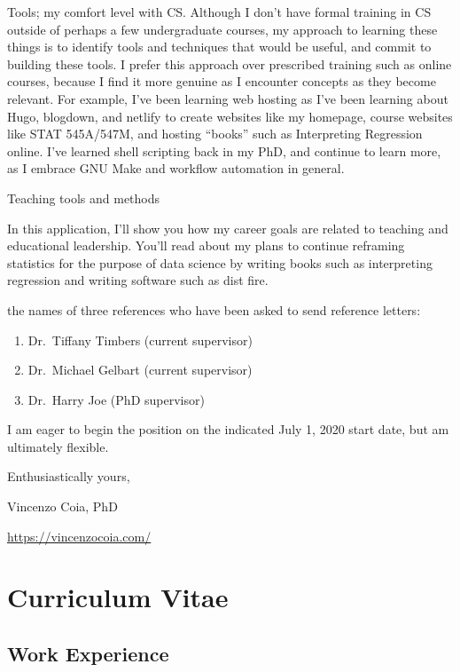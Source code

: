 \documentclass[]{article}
\providecommand{\tightlist}{%
  \setlength{\itemsep}{0pt}\setlength{\parskip}{0pt}}
\begin{document}
Tools; my comfort level with CS. Although I don't have formal training in CS outside of perhaps a few undergraduate courses, my approach to learning these things is to identify tools and techniques that would be useful, and commit to building these tools. I prefer this approach over prescribed training such as online courses, because I find it more genuine as I encounter concepts as they become relevant. For example, I've been learning web hosting as I've been learning about Hugo, blogdown, and netlify to create websites like my homepage, course websites like STAT 545A/547M, and hosting ``books'' such as Interpreting Regression online. I've learned shell scripting back in my PhD, and continue to learn more, as I embrace GNU Make and workflow automation in general.

Teaching tools and methods

In this application, I'll show you how my career goals are related to teaching and educational leadership. You'll read about my plans to continue reframing statistics for the purpose of data science by writing books such as interpreting regression and writing software such as dist fire.

the names of three references who have been asked to send reference letters:

\begin{enumerate}
\def\labelenumi{\arabic{enumi}.}
\tightlist
\item
  Dr.~Tiffany Timbers (current supervisor)
\item
  Dr.~Michael Gelbart (current supervisor)
\item
  Dr.~Harry Joe (PhD supervisor)
\end{enumerate}

I am eager to begin the position on the indicated July 1, 2020 start date, but am ultimately flexible.

Enthusiastically yours,

Vincenzo Coia, PhD

\url{https://vincenzocoia.com/}

\hypertarget{curriculum-vitae}{%
\section{Curriculum Vitae}\label{curriculum-vitae}}

\hypertarget{work-experience}{%
\subsection{Work Experience}\label{work-experience}}
\end{document}
